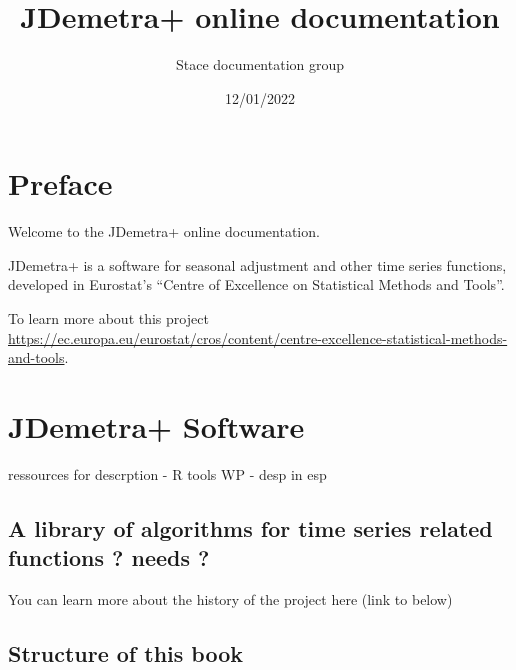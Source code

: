 \documentclass[
  letterpaper,
  DIV=11,
  numbers=noendperiod]{scrreprt}
\title{JDemetra+ online documentation}
\author{Stace documentation group}
\date{12/01/2022}
\renewcommand*\contentsname{Table of contents}
\newcommand\contentsname{Table of contents}
\begin{document}
\maketitle
\ifdefined\Shaded\renewenvironment{Shaded}{\begin{tcolorbox}[sharp corners, interior hidden, boxrule=0pt, frame hidden, enhanced, borderline west={3pt}{0pt}{shadecolor}, breakable]}{\end{tcolorbox}}\fi

\renewcommand*\contentsname{Table of contents}
{
\hypersetup{linkcolor=}
\setcounter{tocdepth}{2}
\tableofcontents
}
\hypertarget{preface}{%
\chapter*{Preface}\label{preface}}

Welcome to the JDemetra+ online documentation.

JDemetra+ is a software for seasonal adjustment and other time series
functions, developed in Eurostat's ``Centre of Excellence on Statistical
Methods and Tools''.

To learn more about this project
\url{https://ec.europa.eu/eurostat/cros/content/centre-excellence-statistical-methods-and-tools}.

\hypertarget{jdemetra-software}{%
\chapter{JDemetra+ Software}\label{jdemetra-software}}

ressources for descrption - R tools WP - desp in esp

\hypertarget{a-library-of-algorithms-for-time-series-related-functions-needs}{%
\section{A library of algorithms for time series related functions ?
needs
?}\label{a-library-of-algorithms-for-time-series-related-functions-needs}}

You can learn more about the history of the project here (link to below)

\hypertarget{structure-of-this-book}{%
\section{Structure of this book}\label{structure-of-this-book}}
\end{document}
